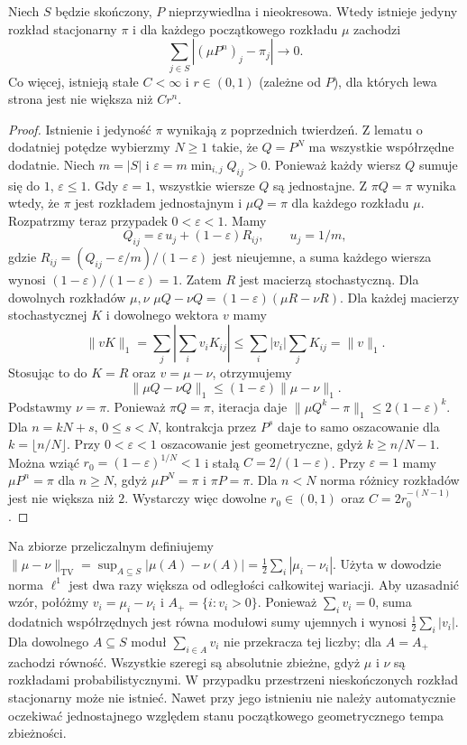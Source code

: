 \begin{twierdzenie}
Niech $S$ będzie skończony, $P$ nieprzywiedlna
i nieokresowa. Wtedy istnieje jedyny rozkład
stacjonarny $\pi$ i dla każdego początkowego
rozkładu $\mu$ zachodzi
\[
\sum_{j\in S}|(\mu P^n)_j-\pi_j|\longrightarrow0.
\]
Co więcej, istnieją stałe $C<\infty$ i $r\in(0,1)$
(zależne od $P$), dla których lewa strona jest
nie większa niż $Cr^n$.
\end{twierdzenie}
\begin{proof}
Istnienie i jedyność $\pi$ wynikają z poprzednich
twierdzeń. Z lematu o dodatniej potędze wybierzmy
$N\geq1$ takie, że $Q=P^N$ ma wszystkie
współrzędne dodatnie.
Niech $m=|S|$ i $\varepsilon=m\min_{i,j}Q_{ij}>0$.
Ponieważ każdy wiersz $Q$ sumuje się do $1$,
$\varepsilon\leq1$. Gdy $\varepsilon=1$,
wszystkie wiersze $Q$ są jednostajne. Z
$\pi Q=\pi$ wynika wtedy, że $\pi$ jest
rozkładem jednostajnym i $\mu Q=\pi$ dla każdego
rozkładu $\mu$.
Rozpatrzmy teraz przypadek $0<\varepsilon<1$. Mamy
\[
Q_{ij}=\varepsilon\,u_j+(1-\varepsilon)R_{ij},
\qquad u_j=1/m,
\]
gdzie $R_{ij}=(Q_{ij}-\varepsilon/m)/(1-\varepsilon)$
jest nieujemne, a suma każdego wiersza wynosi
$(1-\varepsilon)/(1-\varepsilon)=1$. Zatem $R$
jest macierzą stochastyczną.
Dla dowolnych rozkładów $\mu,\nu$
$\mu Q-\nu Q=(1-\varepsilon)(\mu R-\nu R)$.
Dla każdej macierzy stochastycznej $K$ i dowolnego
wektora $v$ mamy
\[
\|vK\|_1=\sum_j\left|\sum_i v_iK_{ij}\right|
\leq\sum_i |v_i|\sum_jK_{ij}=\|v\|_1.
\]
Stosując to do $K=R$ oraz $v=\mu-\nu$, otrzymujemy
\[
\|\mu Q-\nu Q\|_1
\leq(1-\varepsilon)\|\mu-\nu\|_1.
\]
Podstawmy $\nu=\pi$. Ponieważ $\pi Q=\pi$,
iteracja daje
$\|\mu Q^k-\pi\|_1\leq2(1-\varepsilon)^k$.
Dla $n=kN+s$, $0\leq s<N$, kontrakcja przez
$P^s$ daje to samo oszacowanie dla
$k=\lfloor n/N\rfloor$.
Przy $0<\varepsilon<1$ oszacowanie jest geometryczne,
gdyż $k\geq n/N-1$. Można wziąć $r_0=(1-\varepsilon)^{1/N}<1$
i stałą $C=2/(1-\varepsilon)$.
Przy $\varepsilon=1$ mamy $\mu P^n=\pi$
dla $n\geq N$, gdyż $\mu P^N=\pi$ i $\pi P=\pi$.
Dla $n<N$ norma różnicy rozkładów jest nie większa
niż $2$. Wystarczy więc dowolne $r_0\in(0,1)$
oraz $C=2r_0^{-(N-1)}$.
\end{proof}

\begin{uwaga}
Na zbiorze przeliczalnym definiujemy
$\|\mu-\nu\|_{\mathrm{TV}}=\sup_{A\subseteq S}
|\mu(A)-\nu(A)|=\frac12\sum_i|\mu_i-\nu_i|$.
Użyta w dowodzie norma $\ell^1$ jest dwa razy
większa od odległości całkowitej wariacji.
Aby uzasadnić wzór, połóżmy $v_i=\mu_i-\nu_i$
i $A_+=\{i:v_i>0\}$. Ponieważ $\sum_i v_i=0$,
suma dodatnich współrzędnych jest równa modułowi
sumy ujemnych i wynosi $\tfrac12\sum_i|v_i|$.
Dla dowolnego $A\subseteq S$ moduł $\sum_{i\in A}v_i$
nie przekracza tej liczby; dla $A=A_+$ zachodzi
równość. Wszystkie szeregi są absolutnie zbieżne,
gdyż $\mu$ i $\nu$ są rozkładami probabilistycznymi.
W przypadku przestrzeni nieskończonych rozkład
stacjonarny może nie istnieć. Nawet przy jego
istnieniu nie należy automatycznie oczekiwać
jednostajnego względem stanu początkowego
geometrycznego tempa zbieżności.
\end{uwaga}

